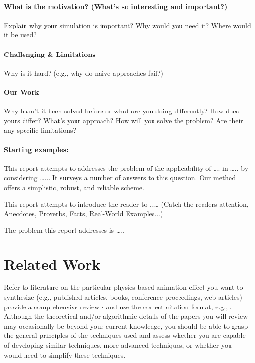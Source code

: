 \documentclass[conference,backref=page]{acmsiggraph}
\begin{document}
\paragraph{What is the motivation? (What's so interesting and important?)}
Explain why your simulation is important?  Why would you need it?  Where would it be used?

\paragraph{Challenging \& Limitations}
Why is it hard? (e.g., why do naive approaches fail?)

\paragraph{Our Work}
Why hasn't it been solved before or what are you doing differently? How does yours differ?
What's your approach?  How will you solve the problem?  Are their any specific limitations?


\paragraph{Starting examples:}
This report attempts to addresses the problem of the applicability of …. in ….. by considering …...  It surveys a number of answers to this question.  Our method offers a simplistic, robust, and reliable scheme.

This report attempts to introduce the reader to …… 
(Catch the readers attention, Anecdotes, Proverbs, Facts, Real-World Examples...)

The problem this report addresses is …..


\section{Related Work}
Refer to literature on the particular physics-based animation effect you want to synthesize (e.g., published articles, books, conference proceedings, web articles) provide a comprehensive review - and use the correct citation format, e.g., \cite{Sako00}. Although the theoretical and/or algorithmic details of the papers you will review may occasionally be beyond your current knowledge, you should be able to grasp the general principles of the techniques used and assess whether you are capable of developing similar techniques, more advanced techniques, or whether you would need to simplify these techniques. 
\end{document}

